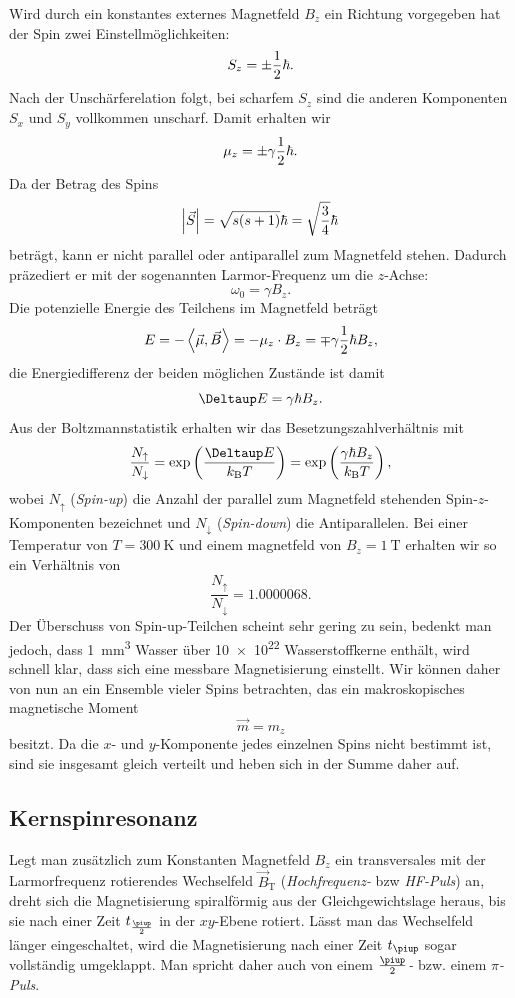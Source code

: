 \documentclass[
    11pt,
    ngerman
]{scrreprt}
\begin{document}
Wird durch ein konstantes externes Magnetfeld $B_z$ ein Richtung vorgegeben hat
der Spin zwei Einstellmöglichkeiten:
\[
    S_z = \pm\frac 12\hbar.
\]
Nach der Unschärferelation folgt, bei scharfem $S_z$ sind die anderen
Komponenten $S_x$ und $S_y$ vollkommen unscharf. Damit erhalten wir
\[
    \mu_z = \pm\gamma\frac 12\hbar.
\]
Da der Betrag des Spins 
\[
    \abs{\vec S} = \sqrt{s(s+1)}\hbar = \sqrt{\frac34}\hbar
\]
beträgt, kann er nicht parallel oder antiparallel zum Magnetfeld stehen.
Dadurch präzediert er mit der sogenannten Larmor-Frequenz um die $z$-Achse:
\[
    \omega_0 = \gamma B_z.
\]
Die potenzielle Energie des Teilchens im Magnetfeld beträgt
\[
    E = -\left\langle\vec\mu,\vec B\right\rangle = -\mu_z \cdot B_z = \mp\gamma\frac 12\hbar B_z,
\]
die Energiedifferenz der beiden möglichen Zustände ist damit
\[
    \Deltaup E = \gamma\hbar B_z.
\]
Aus der Boltzmannstatistik erhalten wir das Besetzungszahlverhältnis mit
\[
    \frac{N_\uparrow}{N_\downarrow} = \dexp{\frac{\Deltaup E}{k_\text{B}T}} =
    \dexp{\frac{\gamma\hbar B_z}{k_\text{B}T}},
\]
wobei $N_\uparrow$ (\emph{Spin-up}) die Anzahl der parallel zum Magnetfeld
stehenden Spin-$z$-Komponenten bezeichnet und $N_\downarrow$ (\emph{Spin-down})
die Antiparallelen. Bei einer Temperatur von $T = \SI{300}{\kelvin}$ und einem
magnetfeld von $B_z = \SI{1}{\tesla}$ erhalten wir so ein Verhältnis von
\[
    \frac{N_\uparrow}{N_\downarrow} = \num{1.0000068}.
\]
Der Überschuss von Spin-up-Teilchen scheint sehr gering zu sein, bedenkt man
jedoch, dass \SI{1}{\milli\meter\cubed} Wasser über \num{10e22} Wasserstoffkerne
enthält, wird schnell klar, dass sich eine messbare Magnetisierung einstellt.
Wir können daher von nun an ein Ensemble vieler Spins betrachten, das ein
makroskopisches magnetische Moment
\[
    \vec m = m_z
\]
besitzt. Da die $x$- und $y$-Komponente jedes einzelnen Spins nicht bestimmt ist, sind sie insgesamt gleich verteilt und heben sich in der Summe daher auf.

\subsection{Kernspinresonanz}

Legt man zusätzlich zum Konstanten Magnetfeld $B_z$ ein transversales mit der
Larmorfrequenz rotierendes Wechselfeld $\vec B_\text{T}$ (\emph{Hochfrequenz-}
bzw \emph{HF-Puls}) an, dreht sich die Magnetisierung spiralförmig aus der
Gleichgewichtslage heraus, bis sie nach einer Zeit $t_{\frac\piup2}$ in der
$xy$-Ebene rotiert. Lässt man das Wechselfeld länger eingeschaltet, wird die
Magnetisierung nach einer Zeit $t_{\piup}$ sogar vollständig umgeklappt. Man
spricht daher auch von einem \emph{$\frac\piup2$-} bzw. einem
\emph{$\pi$-Puls}.
\end{document}

